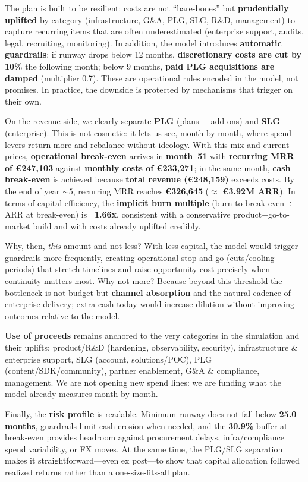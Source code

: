 \documentclass[11pt, a4paper, oneside]{article}
\begin{document}
The plan is built to be resilient: costs are not ``bare-bones'' but \textbf{prudentially uplifted} by category (infrastructure, G\&A, PLG, SLG, R\&D, management) to capture recurring items that are often underestimated (enterprise support, audits, legal, recruiting, monitoring). In addition, the model introduces \textbf{automatic guardrails}: if runway drops below 12 months, \textbf{discretionary costs are cut by 10\%} the following month; below 9 months, \textbf{paid PLG acquisitions are damped} (multiplier 0.7). These are operational rules encoded in the model, not promises. In practice, the downside is protected by mechanisms that trigger on their own.

On the revenue side, we clearly separate \textbf{PLG} (plans + add-ons) and \textbf{SLG} (enterprise). This is not cosmetic: it lets us see, month by month, where spend levers return more and rebalance without ideology. With this mix and current prices, \textbf{operational break-even} arrives in \textbf{month~51} with \textbf{recurring MRR of €247{,}103} against \textbf{monthly costs of €233{,}271}; in the same month, \textbf{cash break-even} is achieved because \textbf{total revenue (€248{,}159)} exceeds costs. By the end of year $\sim 5$, recurring MRR reaches \textbf{€326{,}645} ($\approx$ \textbf{€3.92M ARR}). In terms of capital efficiency, the \textbf{implicit burn multiple} (burn to break-even $\div$ ARR at break-even) is \textbf{~1.66x}, consistent with a conservative product+go-to-market build and with costs already uplifted credibly.

Why, then, \emph{this} amount and not less? With less capital, the model would trigger guardrails more frequently, creating operational stop-and-go (cuts/cooling periods) that stretch timelines and raise opportunity cost precisely when continuity matters most. Why not more? Because beyond this threshold the bottleneck is not budget but \textbf{channel absorption} and the natural cadence of enterprise delivery; extra cash today would increase dilution without improving outcomes relative to the model.

\textbf{Use of proceeds} remains anchored to the very categories in the simulation and their uplifts: product/R\&D (hardening, observability, security), infrastructure \& enterprise support, SLG (account, solutions/POC), PLG (content/SDK/community), partner enablement, G\&A \& compliance, management. We are not opening new spend lines: we are funding what the model already measures month by month. 

Finally, the \textbf{risk profile} is readable. Minimum runway does not fall below \textbf{25.0 months}, guardrails limit cash erosion when needed, and the \textbf{30.9\%} buffer at break-even provides headroom against procurement delays, infra/compliance spend variability, or FX moves. At the same time, the PLG/SLG separation makes it straightforward—even ex post—to show that capital allocation followed realized returns rather than a one-size-fits-all plan.
\end{document}
